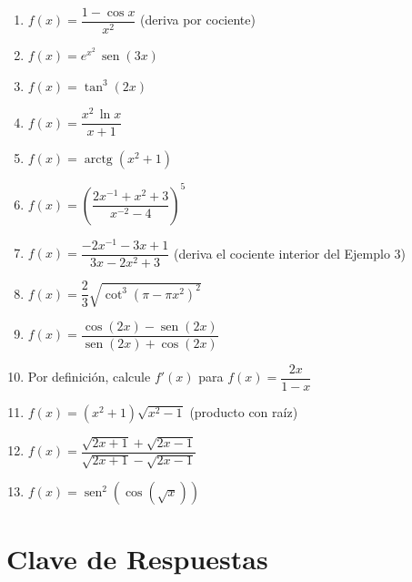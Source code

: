 \documentclass[12pt, letterpaper]{article}
\begin{document}
\begin{enumerate}[leftmargin=*]
  \item \dificil{} $f(x) = \dfrac{1 - \cos x}{x^2}$ (deriva por cociente)

  \item \dificil{} $f(x) = e^{x^2}\,\operatorname{sen}(3x)$

  \item \dificil{} $f(x) = \tan^3(2x)$

  \item \dificil{} $f(x) = \dfrac{x^2\,\ln x}{x + 1}$

  \item \dificil{} $f(x) = \operatorname{arctg}(x^2 + 1)$

  \item \muyDificil{} $f(x) = \left(\dfrac{2x^{-1} + x^2 + 3}{x^{-2} - 4}\right)^{5}$ %

  \item \muyDificil{} $f(x) = \dfrac{-2x^{-1} - 3x + 1}{3x - 2x^2 + 3}$ (deriva el cociente interior del Ejemplo 3) %

  \item \muyDificil{} $f(x) = \dfrac{2}{3}\sqrt{\cot^3(\pi - \pi x^2)^2}$ %

  \item \muyDificil{} $f(x) = \dfrac{\cos(2x) - \operatorname{sen}(2x)}{\operatorname{sen}(2x) + \cos(2x)}$ %

  \item \muyDificil{} Por definición, calcule $f'(x)$ para $f(x) = \dfrac{2x}{1-x}$ %

  \item \muyDificil{} $f(x) = (x^2 + 1)\sqrt{x^2 - 1}$ (producto con raíz)

  \item \muyDificil{} $f(x) = \dfrac{\sqrt{2x + 1} + \sqrt{2x - 1}}{\sqrt{2x + 1} - \sqrt{2x - 1}}$

  \item \muyDificil{} $f(x) = \operatorname{sen}^2\!\left(\cos\!\left(\sqrt{x}\right)\right)$

\end{enumerate}

\newpage
\ifmwclaves
  \section{Clave de Respuestas}
\end{document}
